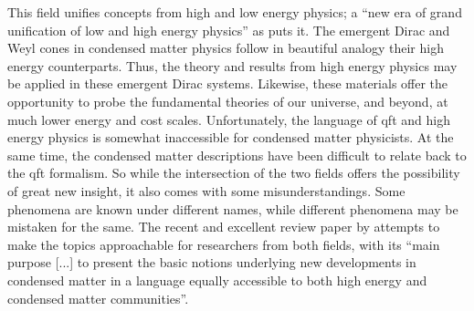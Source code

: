 This field unifies concepts from high and low energy physics;
a ``new era of grand unification of low and high energy physics'' as \textcite{chernodubThermalTransportGeometry2021} puts it.
The emergent Dirac and Weyl cones in condensed matter physics follow in beautiful analogy their high energy counterparts.
Thus, the theory and results from high energy physics may be applied in these emergent Dirac systems.
Likewise, these materials offer the opportunity to probe the fundamental theories of our universe, and beyond, at much lower energy and cost scales.
Unfortunately, the language of \gls{qft} and high energy physics is somewhat inaccessible for condensed matter physicists.
At the same time, the condensed matter descriptions have been difficult to relate back to the \gls{qft} formalism.
So while the intersection of the two fields offers the possibility of great new insight, it also comes with some misunderstandings.
Some phenomena are known under different names, while different phenomena may be mistaken for the same.
The recent and excellent review paper by \textcite{chernodubThermalTransportGeometry2021} attempts to make the topics approachable for researchers from both fields, with its ``main purpose [...] to present the basic notions underlying new developments in condensed matter in a language equally accessible to both high energy and condensed matter communities''.

